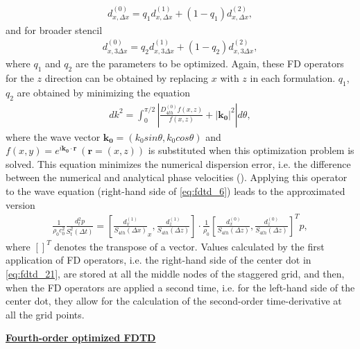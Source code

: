 \vspace*{-7mm}
            \begin{align} \label{eq:fdtd_18}
                d^{(0)}_{x,\Delta x} = q_1 d^{(1)}_{x,\Delta x} + (1-q_1) d^{(2)}_{x,\Delta x},
            \end{align}
            and for broader stencil
            \begin{align} \label{eq:fdtd_19}
                d^{(0)}_{x,3\Delta x} = q_2 d^{(1)}_{x,3\Delta x} + (1-q_2) d^{(2)}_{x,3\Delta x},
            \end{align}
            where $q_1$ and $q_2$ are the parameters to be optimized.
Again, these FD operators for the $z$ direction can be obtained by replacing $x$ with $z$ in each formulation.
            $q_1$, $q_2$ are obtained by minimizing the equation
            \begin{align} \label{eq:fdtd_20}
                dk^2=\int^{\pi/2}_0 \left| \frac{D^{(0)}_{4th}f(x,z)}{f(x,z)} + |\bm{k_0}|^2 \right| d\theta,
            \end{align}
            where the wave vector $\bm{k_0}=(k_0 sin\theta, k_0 cos\theta)$ and $f(x,y) = e^{i\bm{k_0}\cdot \bm{r}}\  (\bm{r}=(x,z))$ is substituted when this
optimization problem is solved.
            This equation minimizes the numerical dispersion error, i.e. the difference between the numerical and analytical phase velocities (\parencite{Ohtani2005Newoptimizationparameters}).
            Applying this operator to the wave equation (right-hand side of \ref{eq:fdtd_6}) leads to the approximated version
            \begin{align} \label{eq:fdtd_21}
                \frac{1}{\rho_0 c_0^2} \frac{d^2_t p}{S_t^2(\Delta t)} = \left[\frac{d^{(1)}_x}{S_{4th}(\Delta x)}_x,\frac{d^{(1)}_z}{S_{4th}(\Delta
z)}\right]\cdot \frac{1}{\rho_0}\left[\frac{d^{(0)}_x}{S_{4th}(\Delta z)}, \frac{d^{(0)}_z}{S_{4th}(\Delta z)}\right]^Tp,
            \end{align}
            where $[]^T$ denotes the transpose of a vector.
            Values calculated by the first application of FD operators, i.e. the right-hand side of the center dot in \ref{eq:fdtd_21},
are stored at all the middle nodes of the staggered grid, and then, when the FD operators are applied a second time, i.e. for the left-hand side of the center dot,
they allow for the calculation of the second-order time-derivative at all the grid points.

\noindent
        \underline{\textbf{Fourth-order optimized FDTD}}


